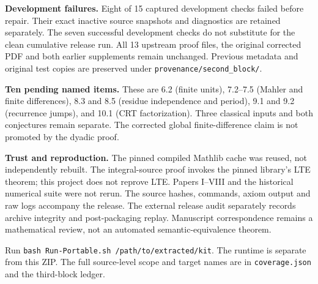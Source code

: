 \documentclass[11pt]{article}
\begin{document}
\textbf{Development failures.} Eight of 15 captured development checks failed before repair. Their exact inactive source snapshots and diagnostics are retained separately. The seven successful development checks do not substitute for the clean cumulative release run. All 13 upstream proof files, the original corrected PDF and both earlier supplements remain unchanged. Previous metadata and original test copies are preserved under \texttt{provenance/second\_block/}.

\textbf{Ten pending named items.} These are 6.2 (finite units), 7.2--7.5 (Mahler and finite differences), 8.3 and 8.5 (residue independence and period), 9.1 and 9.2 (recurrence jumps), and 10.1 (CRT factorization). Three classical inputs and both conjectures remain separate. The corrected global finite-difference claim is not promoted by the dyadic proof.

\textbf{Trust and reproduction.} The pinned compiled Mathlib cache was reused, not independently rebuilt. The integral-source proof invokes the pinned library's LTE theorem; this project does not reprove LTE. Papers I--VIII and the historical numerical suite were not rerun. The source hashes, commands, axiom output and raw logs accompany the release. The external release audit separately records archive integrity and post-packaging replay. Manuscript correspondence remains a mathematical review, not an automated semantic-equivalence theorem.

Run \texttt{bash Run-Portable.sh /path/to/extracted/kit}. The runtime is separate from this ZIP. The full source-level scope and target names are in \texttt{coverage.json} and the third-block ledger.
\end{document}
